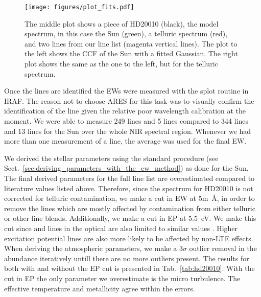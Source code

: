 \documentclass{aa}
\begin{document}
\begin{figure}[tbp!]
    \centering
    \texttt{[image: figures/plot\_fits.pdf]}
    \caption{The middle plot shows a piece of HD20010 (black), the model
    spectrum, in this case the Sun (green), a telluric spectrum (red), and two
    lines from our line list (magenta vertical lines). The plot to the left
    shows the CCF of the Sun with a fitted Gaussian. The right plot shows the
    same as the one to the left, but for the telluric spectrum.}
    \label{fig:plot_fits}
\end{figure}

Once the lines are identified the EWs were measured with the splot
routine in IRAF. The reason not to choose ARES for this task was to
visually confirm the identification of the line given the relative
poor wavelength calibration at the moment. We were able to measure 249
 lines and 5  lines compared to 344 
lines and 13  lines for the Sun over the whole NIR spectral
region. Whenever we had more than one measurement of a line, the average
was used for the final EW.

We derived the stellar parameters using the standard procedure
(see Sect.~\ref{sec:deriving_parameters_with_the_ew_method}) as
done for the Sun. The final derived parameters for the full line
list are overestimated compared to literature values listed above.
Therefore, since the spectrum for HD20010 is not corrected for
telluric contamination, we make a cut in EW at 5\si{m\angstrom},
in order to remove the lines which are mostly affected by contamination
from either telluric or other line blends. Additionally, we make a cut
in EP at \SI{5.5}{eV}. We make this cut since  and 
lines in the optical are also limited to similar
values \citep[see e.g.][]{Sousa2008a}. Higher excitation potential lines
are also more likely to be affected by non-LTE effects.
When deriving the atmospheric parameters, we make a $3 \sigma$ outlier
removal in the abundance iteratively untill there are no more outliers present.
The results for both with and without the EP cut is presented in Tab.~\ref{tab:hd20010}.
With the cut in EP the only parameter we overestimate is the micro turbulence.
The effective temperature and metallicity agree within the errors.
\end{document}
